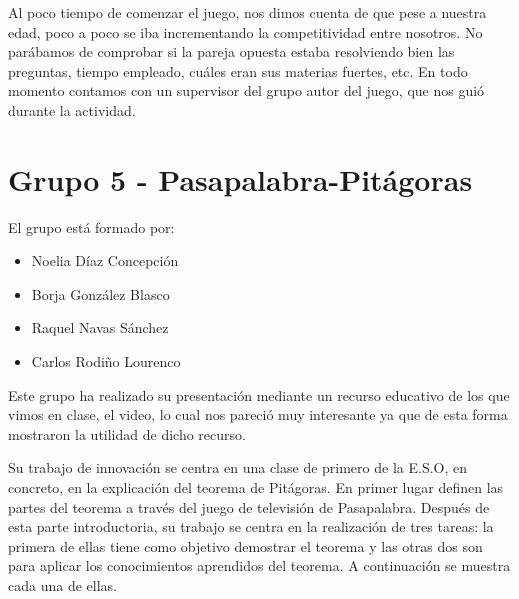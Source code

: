 Al poco tiempo de comenzar el juego, nos dimos cuenta de que pese a nuestra edad, poco a poco se iba incrementando la competitividad entre nosotros. No parábamos de comprobar si la pareja opuesta estaba resolviendo bien las preguntas, tiempo empleado, cuáles eran sus materias fuertes, etc. En todo momento contamos con un supervisor del grupo autor del juego, que nos guió durante la actividad.


\newpage
\section*{Grupo 5 - Pasapalabra-Pitágoras}

El grupo está formado por:

\begin{itemize}
\item Noelia Díaz Concepción
\item Borja González Blasco
\item Raquel Navas Sánchez
\item Carlos Rodiño Lourenco
\end{itemize}

Este grupo ha realizado su presentación mediante un recurso educativo de los que vimos en clase, el video, lo cual nos pareció muy interesante ya que de esta forma mostraron la utilidad de dicho recurso. 

Su trabajo de innovación se centra en una clase de primero de la E.S.O, en concreto, en la explicación del teorema de Pitágoras. En primer lugar definen las partes del teorema a través del juego de televisión de Pasapalabra. Después de esta parte introductoria, su trabajo se centra en la realización de tres tareas: la primera de ellas tiene como objetivo demostrar el teorema y las otras dos son para aplicar los conocimientos aprendidos del teorema. A continuación se muestra cada una de ellas.

